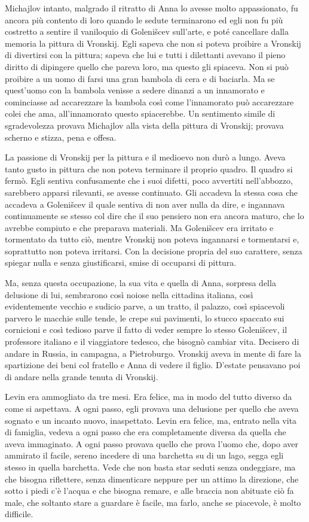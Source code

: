 Michajlov intanto, malgrado il ritratto di Anna lo avesse molto appassionato, fu ancora più contento di loro quando le sedute terminarono ed egli non fu più costretto a sentire il vaniloquio di Golenišcev sull'arte, e poté cancellare dalla memoria la pittura di Vronskij. Egli sapeva che non si poteva proibire a Vronskij di divertirsi con la pittura; sapeva che lui e tutti i dilettanti avevano il pieno diritto di dipingere quello che pareva loro, ma questo gli spiaceva. Non si può proibire a un uomo di farsi una gran bambola di cera e di baciarla. Ma se quest'uomo con la bambola venisse a sedere dinanzi a un innamorato e cominciasse ad accarezzare la bambola così come l'innamorato può accarezzare colei che ama, all'innamorato questo spiacerebbe. Un sentimento simile di sgradevolezza provava Michajlov alla vista della pittura di Vronskij; provava scherno e stizza, pena e offesa. 

La passione di Vronskij per la pittura e il medioevo non durò a lungo. Aveva tanto gusto in pittura che non poteva terminare il proprio quadro. Il quadro si fermò. Egli sentiva confusamente che i suoi difetti, poco avvertiti nell'abbozzo, sarebbero apparsi rilevanti, se avesse continuato. Gli accadeva la stessa cosa che accadeva a Golenišcev il quale sentiva di non aver nulla da dire, e ingannava continuamente se stesso col dire che il suo pensiero non era ancora maturo, che lo avrebbe compiuto e che preparava materiali. Ma Golenišcev era irritato e tormentato da tutto ciò, mentre Vronskij non poteva ingannarsi e tormentarsi e, soprattutto non poteva irritarsi. Con la decisione propria del suo carattere, senza spiegar nulla e senza giustificarsi, smise di occuparsi di pittura. 

Ma, senza questa occupazione, la sua vita e quella di Anna, sorpresa della delusione di lui, sembrarono così noiose nella cittadina italiana, così evidentemente vecchio e sudicio parve, a un tratto, il palazzo, così spiacevoli parvero le macchie sulle tende, le crepe sui pavimenti, lo stucco spaccato sui cornicioni e così tedioso parve il fatto di veder sempre lo stesso Golenišcev, il professore italiano e il viaggiatore tedesco, che bisognò cambiar vita. Decisero di andare in Russia, in campagna, a Pietroburgo. Vronskij aveva in mente di fare la spartizione dei beni col fratello e Anna di vedere il figlio. D'estate pensavano poi di andare nella grande tenuta di Vronskij. 

Levin era ammogliato da tre mesi. Era felice, ma in modo del tutto diverso da come si aspettava. A ogni passo, egli provava una delusione per quello che aveva sognato e un incanto nuovo, inaspettato. Levin era felice, ma, entrato nella vita di famiglia, vedeva a ogni passo che era completamente diversa da quella che aveva immaginato. A ogni passo provava quello che prova l'uomo che, dopo aver ammirato il facile, sereno incedere di una barchetta su di un lago, segga egli stesso in quella barchetta. Vede che non basta star seduti senza ondeggiare, ma che bisogna riflettere, senza dimenticare neppure per un attimo la direzione, che sotto i piedi c'è l'acqua e che bisogna remare, e alle braccia non abituate ciò fa male, che soltanto stare a guardare è facile, ma farlo, anche se piacevole, è molto difficile. 

